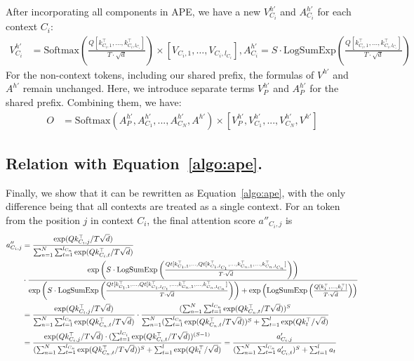 After incorporating all components in APE, we have a new $V^{h'}_{C_i}$ and $A^{h'}_{C_i}$ for each context $C_i$:
\begin{align} 
V^{h'}_{C_i} &= \mathrm{Softmax} \left( \frac{Q [k_{C_i, 1}^\top, \ldots, k_{C_i, l_{C_i}}^\top]}{T \cdot \sqrt{d}} \right) \times [V_{C_i, 1}, \ldots, V_{C_i, l_{C_i}}], A^{h'}_{C_i} = S \cdot \mathrm{LogSumExp} \left( \frac{Q [k_{C_i, 1}^\top, \ldots, k_{C_i, l_{C_i}}^\top]}{T \cdot \sqrt{d}} \right) 
\end{align}
For the non-context tokens, including our shared prefix, the formulas of $V^{h'}$ and $A^{h'}$ remain unchanged. Here, we introduce separate terms $V^{h'}_P$ and $A^{h'}_P$ for the shared prefix. Combining them, we have:
\begin{align} 
O &= \mathrm{Softmax} \left(A^{h'}_{P}, A^{h'}_{C_1}, ..., A^{h'}_{C_N}, A^{h'} \right) \times [V^{h'}_P, V^{h'}_{C_1}, ..., V^{h'}_{C_N}, V^{h'}]
\end{align}
\subsection{Relation with Equation~\ref{algo:ape}.}

Finally, we show that it can be rewritten as Equation~\ref{algo:ape},  with the only difference being that all contexts are treated as a single context. For an token from the position $j$ in context ${C_i}$, the final attention score $a''_{C_i, j}$ is
\begin{align} 
a''_{C_i, j} &= \frac{\exp(Qk_{C_i, j}^\top/T\sqrt{d})}{\sum_{n=1}^{N}\sum_{t=1}^{l_{C_n}}\exp(Qk_{C_i, t}^\top/T\sqrt{d})}\notag \\
&\cdot \frac{\exp\left(S \cdot \mathrm{LogSumExp} \left( \frac{Qt[k_{C_1, 1}^\top, \ldots, Qt[k_{C_1, l_{C_1}}^\top, \ldots, k_{C_n, 1}^\top, \ldots, k_{C_n, l_{C_n}}^\top]}{T \cdot \sqrt{d}} \right)\right)}{\exp\left(S \cdot \mathrm{LogSumExp} \left( \frac{Qt[k_{C_1, 1}^\top, \ldots, Qt[k_{C_1, l_{C_1}}^\top, \ldots, k_{C_n, 1}^\top, \ldots, k_{C_n, l_{C_n}}^\top]}{T \cdot \sqrt{d}} \right)\right) + \exp\left(\mathrm{LogSumExp} \left( \frac{Q [k_{1}^\top, \ldots, k_{l}^\top]}{T \cdot \sqrt{d}} \right)\right)} \\
&= \frac{\exp(Qk_{C_i, j}^\top/T\sqrt{d})}{\sum_{n=1}^{N}\sum_{t=1}^{l_{C_n}}\exp(Qk_{C_n, t}^\top/T\sqrt{d})} \cdot \frac{(\sum_{n=1}^{N}\sum_{t=1}^{l_{C_n}}\exp(Qk_{C_n, t}^\top/T\sqrt{d}))^S}{\sum_{n=1}^N (\sum_{t=1}^{l_{C_n}}\exp(Qk_{C_n, t}^\top/T\sqrt{d}))^S + \sum_{t=1}^{l}\exp(Qk_{t}^\top/\sqrt{d})} \\
&= \frac{\exp(Qk_{C_i, j}^\top/T\sqrt{d}) \cdot (\sum_{t=1}^{l_{C_i}}\exp(Qk_{C_i, t}^\top/T\sqrt{d}))^{(S-1)}}{(\sum_{n=1}^N \sum_{t=1}^{l_{C_n}}\exp(Qk_{C_n, t}^\top/T\sqrt{d}))^S + \sum_{t=1}^{l}\exp(Qk_{t}^\top/\sqrt{d})} = \frac{a'_{C_i, j}}{(\sum_{n=1}^{N}\sum_{t=1}^{l_{C_n}}a'_{C_i, t})^{S}+ \sum_{t=1}^{l}a_{t}}
\end{align}

